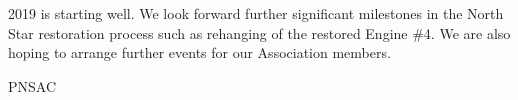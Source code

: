 2019 is starting well. We look forward further significant milestones in the
North Star restoration process such as rehanging of the restored Engine \#4. We
are also hoping to arrange further events for our Association members.


\begin{footnotesize}
    \raggedleft PNSAC\\
\end{footnotesize}



